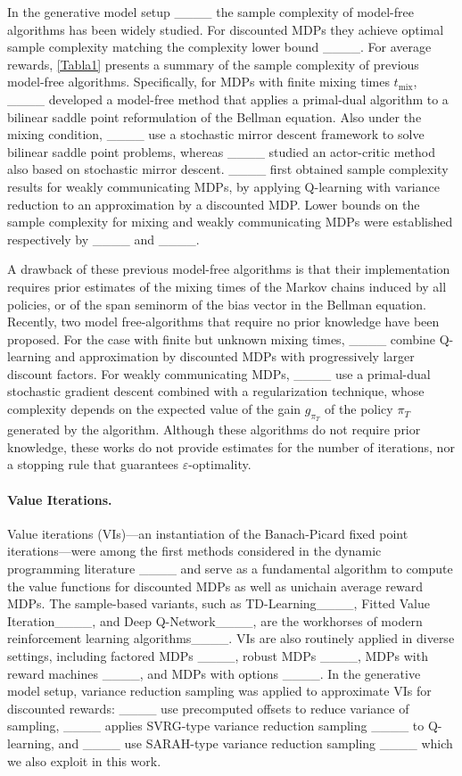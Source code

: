In the generative model setup ____ the sample complexity of model-free algorithms has been widely studied. For  discounted MDPs they achieve  optimal sample complexity matching the complexity lower bound ____.
For average rewards, \cref{Tabla1} presents a summary of the sample complexity of previous model-free algorithms. Specifically, for MDPs with finite mixing times $t_{\text{mix}}$, ____  developed a model-free method that applies a primal-dual algorithm to a bilinear saddle point reformulation of the Bellman equation.  Also under the mixing  condition, ____ use a stochastic mirror descent framework to solve bilinear saddle point problems, whereas ____ studied an actor-critic method also based on stochastic mirror descent. ____ first obtained sample complexity results for weakly communicating MDPs, by applying Q-learning with variance reduction to an approximation by a discounted 
MDP. Lower bounds on the sample complexity for mixing and weakly communicating MDPs were established respectively by ____ and ____.

A drawback of these previous model-free algorithms is that their implementation requires prior estimates of the
mixing times of the Markov chains induced by all policies,
or of the span seminorm of the bias vector in the Bellman equation. 
Recently, two model free-algorithms that require no prior knowledge have been proposed. For the case with finite but  unknown mixing times, ____ combine Q-learning and approximation by discounted MDPs  with progressively larger discount factors. For weakly communicating MDPs, ____ use a primal-dual stochastic gradient descent combined with a regularization technique, whose complexity depends on the expected value of the gain $g_{\pi_T}$ of the policy $\pi_T$ generated by the algorithm. Although these algorithms do not require prior knowledge, these works do not provide estimates for the number of iterations, nor  a stopping rule that guarantees $\varepsilon$-optimality. 

\paragraph{Value Iterations.}
Value iterations (VIs)---an instantiation of the Banach-Picard fixed point iterations---were among the first methods considered in the dynamic programming literature ____ and serve as a fundamental algorithm to compute the value functions for discounted MDPs as well as unichain average reward MDPs. The sample-based variants, such as TD-Learning____, Fitted Value Iteration____, and Deep Q-Network____, are the workhorses of modern reinforcement learning algorithms____. VIs are also routinely applied in diverse settings, including factored MDPs ____, robust MDPs ____, MDPs with reward machines ____, and MDPs with options ____. In the generative model setup, variance reduction sampling was applied to approximate VIs for discounted rewards: ____ use precomputed offsets to reduce variance of sampling, ____ applies SVRG-type variance reduction sampling ____ to Q-learning, and ____ use SARAH-type variance reduction sampling ____ which we also exploit in this work.

